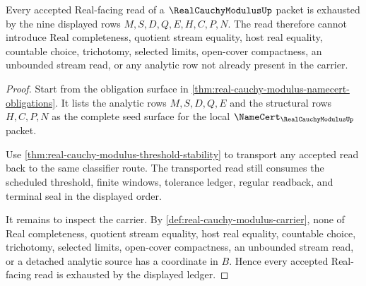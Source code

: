 \begin{theorem}
\label{thm:real-cauchy-modulus-ledger-exhaustion}
Every accepted Real-facing read of a $\RealCauchyModulusUp$ packet is exhausted by the nine displayed rows $M,S,D,Q,E,H,C,P,N$. The read therefore cannot introduce Real completeness, quotient stream equality, host real equality, countable choice, trichotomy, selected limits, open-cover compactness, an unbounded stream read, or any analytic row not already present in the carrier.
\end{theorem}
\begin{proof}
Start from the obligation surface in \autoref{thm:real-cauchy-modulus-namecert-obligations}. It lists the analytic rows $M,S,D,Q,E$ and the structural rows $H,C,P,N$ as the complete seed surface for the local $\NameCert_{\RealCauchyModulusUp}$ packet.

Use \autoref{thm:real-cauchy-modulus-threshold-stability} to transport any accepted read back to the same classifier route. The transported read still consumes the scheduled threshold, finite windows, tolerance ledger, regular readback, and terminal seal in the displayed order.

It remains to inspect the carrier. By \autoref{def:real-cauchy-modulus-carrier}, none of Real completeness, quotient stream equality, host real equality, countable choice, trichotomy, selected limits, open-cover compactness, an unbounded stream read, or a detached analytic source has a coordinate in $B$. Hence every accepted Real-facing read is exhausted by the displayed ledger.
\end{proof}

